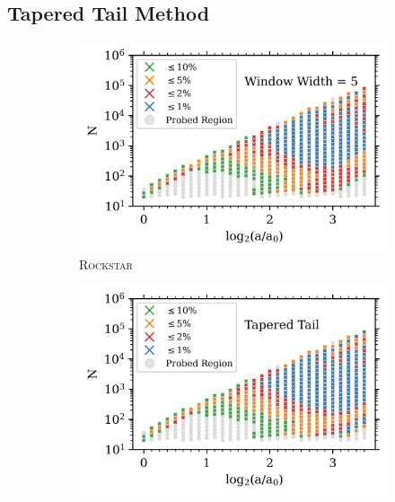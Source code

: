 \subsection{Tapered Tail Method}\label{tapered_tail}

\begin{figure}
\centering
\begin{subfigure}{.49\textwidth}
\centering
\includegraphics[width=\textwidth]{Ch3_Self_Sim/Appendix_Plots_gtr20/Rockstar_n15_mean_past_joyce_mah_M200c_gtr20_FW_WW5_N_vs_a_convergence_MT2_UVM_with_text_min_1000.png}
\caption{\textsc{Rockstar}}
\end{subfigure}
\hfil
\begin{subfigure}{.49\textwidth}
\centering
\includegraphics[width=\textwidth]{Ch3_Self_Sim/Appendix_Plots_gtr20/Rockstar_n15_mean_past_joyce_mah_M200c_gtr20_TT_WW5_N_vs_a_convergence_MT2_UVM_with_text_min_1000.png}

\end{subfigure}
\end{figure}
